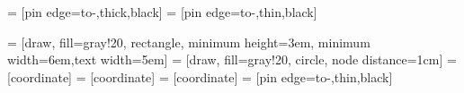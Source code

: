 \usetikzlibrary{shapes,arrows,shadows}

 = [pin edge={to-,thick,black}]
 = [pin edge={to-,thin,black}]

 = [draw, fill=gray!20, rectangle, minimum height=3em, minimum width=6em,text width=5em]
 = [draw, fill=gray!20, circle, node distance=1cm]
 = [coordinate]
 = [coordinate]
 = [coordinate]
 = [pin edge={to-,thin,black}]
